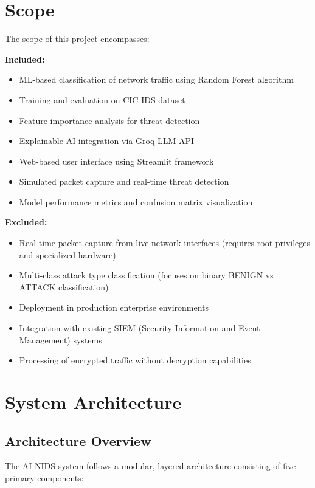 \documentclass[12pt,a4paper]{article}
\begin{document}
\section{Scope}

The scope of this project encompasses:

\textbf{Included:}
\begin{itemize}
    \item ML-based classification of network traffic using Random Forest algorithm
    \item Training and evaluation on CIC-IDS dataset
    \item Feature importance analysis for threat detection
    \item Explainable AI integration via Groq LLM API
    \item Web-based user interface using Streamlit framework
    \item Simulated packet capture and real-time threat detection
    \item Model performance metrics and confusion matrix visualization
\end{itemize}

\textbf{Excluded:}
\begin{itemize}
    \item Real-time packet capture from live network interfaces (requires root privileges and specialized hardware)
    \item Multi-class attack type classification (focuses on binary BENIGN vs ATTACK classification)
    \item Deployment in production enterprise environments
    \item Integration with existing SIEM (Security Information and Event Management) systems
    \item Processing of encrypted traffic without decryption capabilities
\end{itemize}

\section{System Architecture}

\subsection{Architecture Overview}

The AI-NIDS system follows a modular, layered architecture consisting of five primary components:
\end{document}
